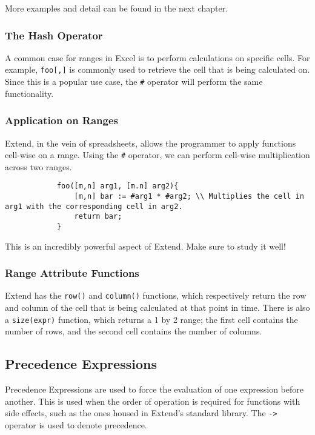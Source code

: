 		\medskip \noindent
		More examples and detail can be found in the next chapter.

		\subsubsection{The Hash Operator}
		A common case for ranges in Excel is to perform calculations on specific cells. For example, \texttt{foo[,]} is commonly used to retrieve the cell that is being calculated on.
		Since this is a popular use case, the \texttt{\#} operator will perform the same functionality.


		\subsubsection{Application on Ranges}
		Extend, in the vein of spreadsheets, allows the programmer to apply functions cell-wise on a range. Using the \texttt{\#} operator, we can perform cell-wise multiplication across two ranges.

		\begin{lstlisting}
			foo([m,n] arg1, [m.n] arg2){
				[m,n] bar := #arg1 * #arg2; \\ Multiplies the cell in arg1 with the corresponding cell in arg2.
				return bar;
			}
		\end{lstlisting}

		\medskip \noindent
		This is an incredibly powerful aspect of Extend. Make sure to study it well!

		\subsubsection{Range Attribute Functions}
		Extend has the \texttt{row()} and \texttt{column()} functions, which respectively return the row and column of the cell that is being calculated at that point in time.
		There is also a \texttt{size(expr)} function, which returns a 1 by 2 range; the first cell contains the number of rows, and the second cell contains the number of columns.

	\subsection{Precedence Expressions}
	Precedence Expressions are used to force the evaluation of one expression before another. This is used when the order of operation is required for functions with side effects, such as the ones housed in Extend's standard library.
	The \texttt{->} operator is used to denote precedence.

